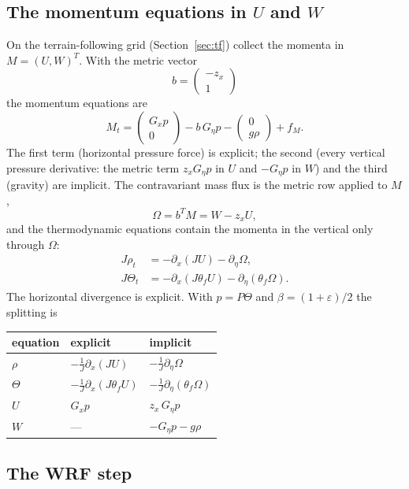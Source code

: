 \documentclass[11pt,a4paper]{article}
\begin{document}
\subsection{The momentum equations in $U$ and $W$}
On the terrain-following grid (Section~\ref{sec:tf}) collect the momenta in $M=(U,W)^T$. With the metric
vector
\[
b=\begin{pmatrix}-z_x\\ 1\end{pmatrix}
\]
the momentum equations are
\[
M_t=\begin{pmatrix}G_xp\\ 0\end{pmatrix}-b\,G_\eta p-\begin{pmatrix}0\\ g\rho\end{pmatrix}+f_M .
\]
The first term (horizontal pressure force) is explicit; the second (every vertical pressure derivative:
the metric term $z_xG_\eta p$ in $U$ and $-G_\eta p$ in $W$) and the third (gravity) are implicit. The contravariant
mass flux is the metric row applied to $M$,
\[
\Omega=b^TM=W-z_xU ,
\]
and the thermodynamic equations contain the momenta in the vertical only through $\Omega$:
\begin{align*}
J\rho_t&=-\partial_x(JU)-\partial_\eta\Omega,\\
J\Theta_t&=-\partial_x(J\theta_fU)-\partial_\eta(\theta_f\Omega).
\end{align*}
The horizontal divergence is explicit. With $p=P\Theta$ and $\beta=(1+\varepsilon)/2$ the splitting is
\begin{center}\small
\begin{tabular}{lll}\toprule
equation & explicit & implicit\\\midrule
$\rho$ & $-\frac1J\partial_x(JU)$ & $-\frac1J\partial_\eta\Omega$\\
$\Theta$ & $-\frac1J\partial_x(J\theta_fU)$ & $-\frac1J\partial_\eta(\theta_f\Omega)$\\
$U$ & $G_xp$ & $z_x\,G_\eta p$\\
$W$ & --- & $-G_\eta p-g\rho$\\\bottomrule
\end{tabular}
\end{center}

\subsection{The WRF step}
\end{document}
